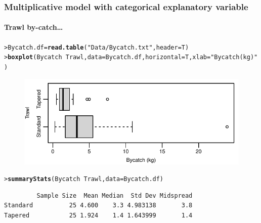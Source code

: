\documentclass{beamer}\usepackage[]{graphicx}\usepackage[]{xcolor}
\makeatletter
\newcommand{\hlstr}[1]{\textcolor[rgb]{0.192,0.494,0.8}{#1}}%
\newcommand{\hlopt}[1]{\textcolor[rgb]{0,0,0}{#1}}%
\newcommand{\hlstd}[1]{\textcolor[rgb]{0.345,0.345,0.345}{#1}}%
\newcommand{\hlkwb}[1]{\textcolor[rgb]{0.69,0.353,0.396}{#1}}%
\newcommand{\hlkwc}[1]{\textcolor[rgb]{0.333,0.667,0.333}{#1}}%
\newcommand{\hlkwd}[1]{\textcolor[rgb]{0.737,0.353,0.396}{\textbf{#1}}}%
\newenvironment{kframe}{%
 \def\at@end@of@kframe{}%
 \ifinner\ifhmode%
  \def\at@end@of@kframe{\end{minipage}}%
  \begin{minipage}{\columnwidth}%
 \fi\fi%
 \def\FrameCommand##1{\hskip\@totalleftmargin \hskip-\fboxsep
 \colorbox{shadecolor}{##1}\hskip-\fboxsep
     \hskip-\linewidth \hskip-\@totalleftmargin \hskip\columnwidth}%
 \MakeFramed {\advance\hsize-\width
   \@totalleftmargin\z@ \linewidth\hsize
   \@setminipage}}%
 {\par\unskip\endMakeFramed%
 \at@end@of@kframe}
\newenvironment{knitrout}{}{} %
\makeatother
\begin{document}
\begin{frame}[fragile]
\frametitle{Multiplicative model with categorical explanatory variable}
\framesubtitle{Trawl by-catch\ldots}
\begin{knitrout}\scriptsize
{}\color{fgcolor}\begin{kframe}
\begin{alltt}
\hlstd{> }\hlstd{Bycatch.df}\hlkwb{=}\hlkwd{read.table}\hlstd{(}\hlstr{"Data/Bycatch.txt"}\hlstd{,}\hlkwc{header}\hlstd{=T)}
\hlstd{> }\hlkwd{boxplot}\hlstd{(Bycatch}\hlopt{~}\hlstd{Trawl,}\hlkwc{data}\hlstd{=Bycatch.df,} \hlkwc{horizontal}\hlstd{=T,}\hlkwc{xlab}\hlstd{=}\hlstr{"Bycatch (kg)"}\hlstd{)}
\end{alltt}
\end{kframe}
\end{knitrout}



\begin{figure}
  \centering
  \includegraphics{figure/RC-H06-048}
\end{figure}

\begin{knitrout}\scriptsize
{}\color{fgcolor}\begin{kframe}
\begin{alltt}
\hlstd{> }\hlkwd{summaryStats}\hlstd{(Bycatch}\hlopt{~}\hlstd{Trawl,}\hlkwc{data}\hlstd{=Bycatch.df)}
\end{alltt}
\begin{verbatim}
         Sample Size  Mean Median  Std Dev Midspread
Standard          25 4.600    3.3 4.983138       3.8
Tapered           25 1.924    1.4 1.643999       1.4
\end{verbatim}
\end{kframe}
\end{knitrout}
\end{frame}
\end{document}
